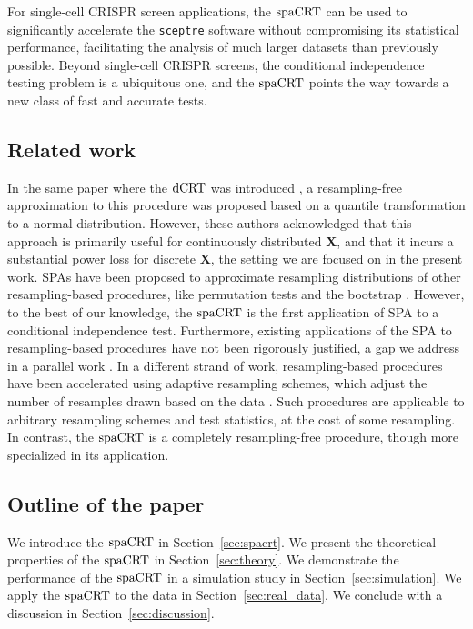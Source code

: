 \documentclass[12pt]{article}
\theoremstyle{definition}
\newcommand{\prx}{\bm X}								%
\newcommand{\dCRT}{\textnormal{dCRT}} 					%
\newcommand{\spacrt}{\textnormal{spaCRT}}               %
\begin{document}
For single-cell CRISPR screen applications, the $\spacrt$ can be used to significantly accelerate the \verb|sceptre| software without compromising its statistical performance, facilitating the analysis of much larger datasets than previously possible. Beyond single-cell CRISPR screens, the conditional independence testing problem is a ubiquitous one, and the $\spacrt$ points the way towards a new class of fast and accurate tests.

\subsection{Related work}

In the same paper where the $\dCRT$ was introduced \citep{Liu2022a}, a resampling-free approximation to this procedure was proposed based on a quantile transformation to a normal distribution. However, these authors acknowledged that this approach is primarily useful for continuously distributed $\prx$, and that it incurs a substantial power loss for discrete $\prx$, the setting we are focused on in the present work. SPAs have been proposed to approximate resampling distributions of other resampling-based procedures, like permutation tests \citep{Robinson1982} and the bootstrap \citep{Hinkley1988}. However, to the best of our knowledge, the $\spacrt$ is the first application of SPA to a conditional independence test. Furthermore, existing applications of the SPA to resampling-based procedures have not been rigorously justified, a gap we address in a parallel work \citep{Niu2024}. In a different strand of work, resampling-based procedures have been accelerated using adaptive resampling schemes, which adjust the number of resamples drawn based on the data \citep{Besag1991,Gandy2009,Gandy2014,Gandy2016,Gandy2017a,Fischer2024a,Fischer2024}. Such procedures are applicable to arbitrary resampling schemes and test statistics, at the cost of some resampling. In contrast, the $\spacrt$ is a completely resampling-free procedure, though more specialized in its application.

\subsection{Outline of the paper}

We introduce the $\spacrt$ in Section~\ref{sec:spacrt}. We present the theoretical properties of the $\spacrt$ in Section~\ref{sec:theory}. We demonstrate the performance of the $\spacrt$ in a simulation study in Section~\ref{sec:simulation}. We apply the $\spacrt$ to the \citet{Gasperini2019a} data in Section~\ref{sec:real_data}. We conclude with a discussion in Section~\ref{sec:discussion}.
\end{document}
